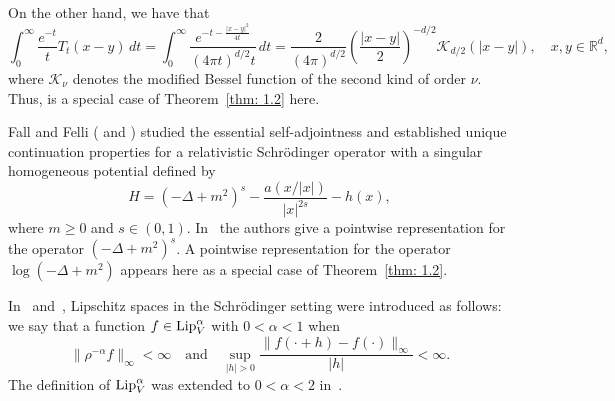 \documentclass[10pt, a4paper, reqno]{amsart}
\theoremstyle{definition}
\theoremstyle{remark}
\newcommand{\Lip}{\textup{Lip}}
\numberwithin{equation}{section}
\begin{document}
On the other hand, we have that
\begin{equation*}
    \int_0^\infty \frac{e^{-t}}{t} T_t(x-y) \, dt = \int_0^\infty \frac{e^{-t - \frac{|x-y|^2}{4t}}}{(4\pi t)^{d/2} t} \, dt = \frac{2}{(4\pi)^{d/2}} \left(\frac{|x-y|}{2}\right)^{-d/2} \mathcal{K}_{d/2}(|x-y|), \quad x, y \in \mathbb{R}^d,
\end{equation*}
where $\mathcal{K}_\nu$ denotes the modified Bessel function of the second kind of order $\nu$. Thus, \cite[Theorem~1.1]{Feu1} is a special case of Theorem~\ref{thm: 1.2} here.


Fall and Felli (\cite{FaFe2} and \cite{FaFe1}) studied the essential self-adjointness and established unique continuation properties for a relativistic Schr\"odinger operator with a singular homogeneous potential defined by 
\begin{equation*}
    H = (-\Delta + m^2)^s - \frac{a(x/|x|)}{|x|^{2s}} - h(x), 
\end{equation*}
where $m \geq 0$ and $s \in (0,1)$. In~\cite[Eq.~(1.3)]{FaFe1} the authors give a pointwise representation for the operator $(-\Delta + m^2)^s$. A pointwise representation for the operator $\log(-\Delta + m^2)$ appears here as a special case of Theorem~\ref{thm: 1.2}.

In~\cite{BHS} and~\cite{MSTZ}, Lipschitz spaces in the Schr\"odinger setting were introduced as follows: we say that a function $f \in \Lip_V^\alpha$ with $0 < \alpha < 1$ when 
\begin{equation*}
    \|\rho^{-\alpha} f\|_\infty < \infty \quad \text{and} \quad \sup_{|h|>0} \frac{\|f(\cdot + h) - f(\cdot)\|_\infty}{|h|} < \infty .
\end{equation*}
The definition of $\Lip_V^\alpha$ was extended to $0 < \alpha < 2$ in~\cite{dLT}.
\end{document}
